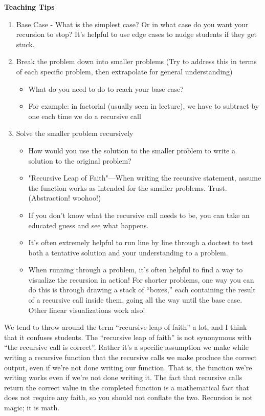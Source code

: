 \begin{meta}
\textbf{Teaching Tips}
\begin{enumerate}
	    \item Base Case - What is the simplest case? Or in what case do you want your recursion to stop? It's helpful to use edge cases to nudge students if they get stuck.
	    \item Break the problem down into smaller problems (Try to address this in terms of each specific problem, then extrapolate for general understanding)
	    \begin{itemize}
			\item What do you need to do to reach your base case?
			\item For example: in factorial (usually seen in lecture), we have to subtract by one each time we do a recursive call
		\end{itemize}
		\item Solve the smaller problem recursively
		\begin{itemize}
			\item How would you use the solution to the smaller problem to write a solution to the original problem?
			\item "Recursive Leap of Faith"---When writing the recursive statement, assume the function works as intended for the smaller problems. Trust. (Abstraction! woohoo!)
			\item If you don't know what the recursive call needs to be, you can take an educated guess and see what happens. 
			\item It's often extremely helpful to run line by line through a doctest to test both a tentative solution and your understanding to a problem.
			\item When running through a problem, it's often helpful to find a way to visualize the recursion in action! For shorter problems, one way you can do this is through drawing a stack of ``boxes,'' each containing the result of a recursive call inside them, going all the way until the base case. Other linear visualizations work also!
		\end{itemize}
\end{enumerate}
We tend to throw around the term ``recursive leap of faith'' a lot, and I think that it confuses students. The ``recursive leap of faith'' is not synonymous with ``the recursive call is correct''. Rather it's a specific assumption we make while writing a recursive function that the recursive calls we make produce the correct output, even if we're not done writing our function. That is, the function we're writing works even if we're not done writing it. The fact that recursive calls return the correct value in the completed function is a mathematical fact that does not require any faith, so you should not conflate the two. Recursion is not magic; it is math.


\end{meta}
